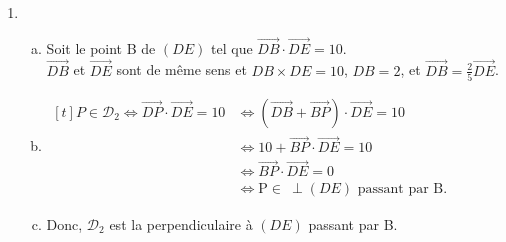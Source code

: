 \documentclass[12pt, a4paper]{article}
\begin{document}
\begin{Exercise}[number={121}]
\begin{enumerate}[1)]
\begin{enumerate}[a)]
                \end{enumerate}
        \item   \begin{enumerate}[a)]
                    \item   Soit le point B de $(DE)$ tel que $\overrightarrow{DB}\cdot\overrightarrow{DE}=10$. \\ $\overrightarrow{DB}$ et $\overrightarrow{DE}$ sont de même sens et $DB\times DE=10$, $DB=2$, et $\overrightarrow{DB}=\frac{2}{5}\overrightarrow{DE}$.
                    \item   $\begin{aligned}[t]
                                P\in\mathcal{D}_2\iff\overrightarrow{DP}\cdot\overrightarrow{DE}=10&\iff\left(\overrightarrow{DB}+\overrightarrow{BP}\right)\cdot\overrightarrow{DE}=10 &\\
                                &\iff 10+\overrightarrow{BP}\cdot\overrightarrow{DE}=10 &\\
                                &\iff \overrightarrow{BP}\cdot\overrightarrow{DE}=0 &\\
                                &\iff\text{P}\in\ \perp(DE)\text{ passant par B.}
                            \end{aligned}$ 
                    \item   Donc, $\mathcal{D}_2$ est la perpendiculaire à $(DE)$ passant par B.
                \end{enumerate}
    \end{enumerate}
\end{Exercise}

\pagebreak
\end{document}
